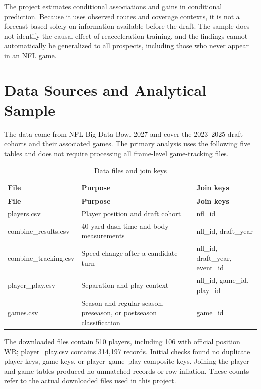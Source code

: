 \documentclass[a4paper,11pt]{article}
\newcommand{\code}[1]{{\small\ttfamily #1}}
\newlength{\tablecontentwidth}
\begin{document}
The project estimates conditional associations and gains in conditional prediction. Because it uses observed routes and coverage contexts, it is not a forecast based solely on information available before the draft. The sample does not identify the causal effect of reacceleration training, and the findings cannot automatically be generalized to all prospects, including those who never appear in an NFL game.

\section{Data Sources and Analytical Sample}

The data come from NFL Big Data Bowl 2027 and cover the 2023--2025 draft cohorts and their associated games. The primary analysis uses the following five tables and does not require processing all frame-level game-tracking files.

{\small
\begin{longtable}{@{}P{0.29\tablecontentwidth}P{0.37\tablecontentwidth}P{0.34\tablecontentwidth}@{}}
\caption{Data files and join keys}\label{tab:1}\\
\toprule
\textbf{File} & \textbf{Purpose} & \textbf{Join keys} \\
\midrule
\endfirsthead
\toprule
\textbf{File} & \textbf{Purpose} & \textbf{Join keys} \\
\midrule
\endhead
\bottomrule
\endlastfoot
\code{players.csv} & Player position and draft cohort & \code{nfl\_\allowbreak{}id} \\[.15em]
\code{combine\_\allowbreak{}results.csv} & 40-yard dash time and body measurements & \code{nfl\_\allowbreak{}id}, \code{draft\_\allowbreak{}year} \\[.15em]
\code{combine\_\allowbreak{}tracking.csv} & Speed change after a candidate turn & \code{nfl\_\allowbreak{}id}, \code{draft\_\allowbreak{}year}, \code{event\_\allowbreak{}id} \\[.15em]
\code{player\_\allowbreak{}play.csv} & Separation and play context & \code{nfl\_\allowbreak{}id}, \code{game\_\allowbreak{}id}, \code{play\_\allowbreak{}id} \\[.15em]
\code{games.csv} & Season and regular-season, preseason, or postseason classification & \code{game\_\allowbreak{}id} \\[.15em]
\end{longtable}
}

The downloaded files contain 510 players, including 106 with official position WR; \code{player\_\allowbreak{}play.csv} contains 314,197 records. Initial checks found no duplicate player keys, game keys, or player--game--play composite keys. Joining the player and game tables produced no unmatched records or row inflation. These counts refer to the actual downloaded files used in this project.
\end{document}
